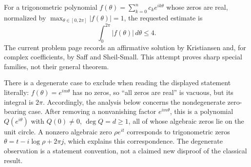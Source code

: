 For a trigonometric polynomial $f(\theta)=\sum_{k=0}^n c_ke^{ik\theta}$ whose zeros are real, normalized by $\max_{\theta\in[0,2\pi]}|f(\theta)|=1$, the requested estimate is
\[
 \int_0^{2\pi}|f(\theta)|\,d\theta\le4.\tag{1}
\]
The current problem page records an affirmative solution by Kristiansen and, for complex coefficients, by Saff and Sheil-Small. This attempt proves sharp special families, not their general theorem.

There is a degenerate case to exclude when reading the displayed statement literally: $f(\theta)=e^{im\theta}$ has no zeros, so ``all zeros are real'' is vacuous, but its integral is $2\pi$. Accordingly, the analysis below concerns the nondegenerate zero-bearing case. After removing a nonvanishing factor $e^{im\theta}$, this is a polynomial $Q(e^{i\theta})$ with $Q(0)\ne0$, $\deg Q=d\ge1$, all of whose algebraic zeros lie on the unit circle. A nonzero algebraic zero $\rho e^{it}$ corresponds to trigonometric zeros $\theta=t-i\log\rho+2\pi j$, which explains this correspondence. The degenerate observation is a statement convention, not a claimed new disproof of the classical result.
